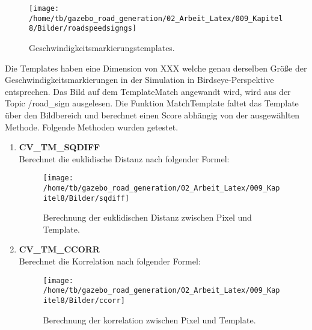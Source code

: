 \begin{figure}[H]
\begin{center}
  \texttt{[image: /home/tb/gazebo\_road\_generation/02\_Arbeit\_Latex/009\_Kapitel8/Bilder/roadspeedsigngs]}%
  \caption[Geschwindigkeitsmarkierungstemplates]%
           {\label{fig:Geschwindigkeitsmarkierungstemplates}%
           Geschwindigkeitsmarkierungstemplates.
           }
\end{center}
\end{figure}

Die Templates haben eine Dimension von XXX welche genau derselben Gr{\"o}{\ss}e der Geschwindigkeitsmarkierungen in der Simulation in Birdseye-Perspektive entsprechen. Das Bild auf dem TemplateMatch angewandt wird, wird aus der Topic /road\_sign ausgelesen.
Die Funktion MatchTemplate faltet das Template {\"u}ber den Bildbereich und berechnet einen Score abh{\"a}ngig von der ausgew{\"a}hlten Methode. Folgende Methoden wurden getestet.

\begin{enumerate}

\item[] \textbf{CV\_TM\_SQDIFF}\hfill \\
Berechnet die euklidische Distanz nach folgender Formel:

\begin{figure}[H]
\begin{center}
  \texttt{[image: /home/tb/gazebo\_road\_generation/02\_Arbeit\_Latex/009\_Kapitel8/Bilder/sqdiff]}%
  \caption[SQDIFF]%
           {\label{fig:SQDIFF}%
           Berechnung der euklidischen Distanz zwischen Pixel und Template.
           }
\end{center}
\end{figure}




\item[] \textbf{CV\_TM\_CCORR}\hfill \\
Berechnet die Korrelation nach folgender Formel:

\begin{figure}[H]
\begin{center}
  \texttt{[image: /home/tb/gazebo\_road\_generation/02\_Arbeit\_Latex/009\_Kapitel8/Bilder/ccorr]}%
  \caption[CCORR]%
           {\label{fig:CCORR}%
           Berechnung der korrelation zwischen Pixel und Template.
           }
\end{center}
\end{figure}


\end{enumerate}


